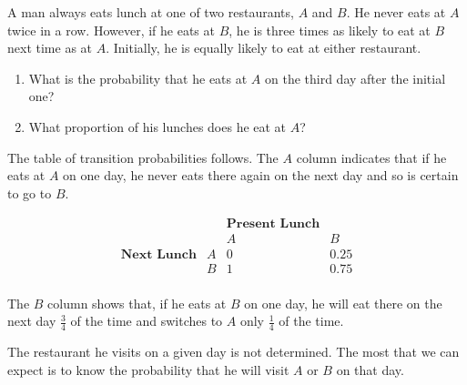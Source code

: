 \documentclass{ximera}
\begin{document}
\begin{example}\label{007199}
A man always eats lunch at one of two restaurants, $A$ and $B$. He never eats at $A$ twice in a row. However, if he eats at $B$, he is three times as likely to eat at $B$ next time as at $A$. Initially, he is equally likely to eat at either restaurant.


\begin{enumerate}
\item What is the probability that he eats at $A$ on the third day after the initial one?

\item What proportion of his lunches does he eat at $A$?

\end{enumerate}

 \begin{explanation}
  The table of transition probabilities follows. The $A$ column indicates that if he eats at $A$ on one day, he never eats there again on the next day and so is certain to go to $B$.
  
$$
\begin{array}{ccccc}
   & & \textbf{Present Lunch} & \\
   &  & A & B  \\
 \textbf{Next Lunch} &   A &    0  &    0.25 \\
   & B &    1  &    0.75   \\
 \end{array}
 $$
 

The $B$ column shows that, if he eats at $B$ on one day, he will eat there on the next day $\frac{3}{4}$ of the time and switches to $A$ only $\frac{1}{4}$ of the time.


The restaurant he visits on a given day is not determined. The most that we can expect is to know the probability that he will visit $A$ or $B$ on that day.


\end{explanation}
\end{example}
\end{document}
